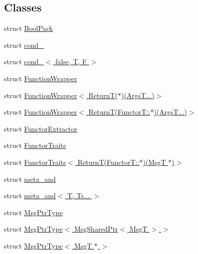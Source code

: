 \subsection*{Classes}
\begin{DoxyCompactItemize}
\item 
struct \hyperlink{structvt_1_1util_1_1_bool_pack}{Bool\+Pack}
\item 
struct \hyperlink{structvt_1_1util_1_1cond__}{cond\+\_\+}
\item 
struct \hyperlink{structvt_1_1util_1_1cond___3_01false_00_01_t_00_01_f_01_4}{cond\+\_\+$<$ false, T, F $>$}
\item 
struct \hyperlink{structvt_1_1util_1_1_function_wrapper}{Function\+Wrapper}
\item 
struct \hyperlink{structvt_1_1util_1_1_function_wrapper_3_01_return_t_07_5_08_07_args_t_8_8_8_08_4}{Function\+Wrapper$<$ Return\+T($\ast$)(\+Args\+T...)$>$}
\item 
struct \hyperlink{structvt_1_1util_1_1_function_wrapper_3_01_return_t_07_functor_t_1_1_5_08_07_args_t_8_8_8_08_4}{Function\+Wrapper$<$ Return\+T(\+Functor\+T\+::$\ast$)(\+Args\+T...)$>$}
\item 
struct \hyperlink{structvt_1_1util_1_1_functor_extractor}{Functor\+Extractor}
\item 
struct \hyperlink{structvt_1_1util_1_1_functor_traits}{Functor\+Traits}
\item 
struct \hyperlink{structvt_1_1util_1_1_functor_traits_3_01_return_t_07_functor_t_1_1_5_08_07_msg_t_01_5_08_4}{Functor\+Traits$<$ Return\+T(\+Functor\+T\+::$\ast$)(\+Msg\+T $\ast$)$>$}
\item 
struct \hyperlink{structvt_1_1util_1_1meta__and}{meta\+\_\+and}
\item 
struct \hyperlink{structvt_1_1util_1_1meta__and_3_01_t_00_01_ts_8_8_8_01_4}{meta\+\_\+and$<$ T, Ts... $>$}
\item 
struct \hyperlink{structvt_1_1util_1_1_msg_ptr_type}{Msg\+Ptr\+Type}
\item 
struct \hyperlink{structvt_1_1util_1_1_msg_ptr_type_3_01_msg_shared_ptr_3_01_msg_t_01_4_01_4}{Msg\+Ptr\+Type$<$ Msg\+Shared\+Ptr$<$ Msg\+T $>$ $>$}
\item 
struct \hyperlink{structvt_1_1util_1_1_msg_ptr_type_3_01_msg_t_01_5_01_4}{Msg\+Ptr\+Type$<$ Msg\+T $\ast$ $>$}
\end{DoxyCompactItemize}
